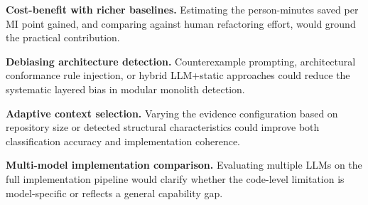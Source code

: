 \textbf{Cost-benefit with richer baselines.} Estimating the person-minutes saved per MI point gained, and comparing against human refactoring effort, would ground the practical contribution.

\textbf{Debiasing architecture detection.} Counterexample prompting, architectural conformance rule injection, or hybrid LLM+static approaches could reduce the systematic layered bias in modular monolith detection.

\textbf{Adaptive context selection.} Varying the evidence configuration based on repository size or detected structural characteristics could improve both classification accuracy and implementation coherence.

\textbf{Multi-model implementation comparison.} Evaluating multiple LLMs on the full implementation pipeline would clarify whether the code-level limitation is model-specific or reflects a general capability gap.
